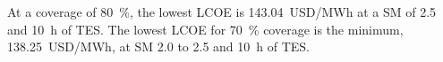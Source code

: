 At a coverage of \SI{80}{\percent}, the lowest LCOE is \SI{143.04}{USD/MWh} at a SM of 2.5 and \SI{10}{h} of TES. The lowest LCOE for \SI{70}{\percent} coverage is the minimum, \SI{138.25}{USD/MWh}, at SM 2.0 to 2.5 and \SI{10}{h} of TES.